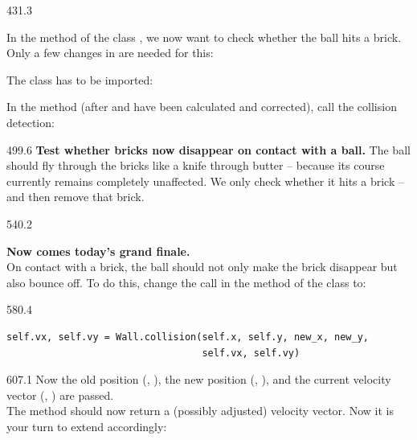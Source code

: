 \documentclass{aslab}
\begin{document}
\begin{region}[pitch=13.5]{431.3}
\begin{ntasks}
\item In the  method of the class , we now want to check
  whether the ball hits a brick. Only a few changes in  are
  needed for this:
  \begin{alist}
  \item The class  has to be imported: 
  \item In the  method (after  and  have
    been calculated and corrected), call the collision detection:
  \end{alist}
\end{ntasks}
\end{region}

\begin{region}[x=74.7,right=0,pitch=13.2]{499.6}
\textbf{Test whether bricks now disappear on contact with a ball.} The ball
should fly through the bricks like a knife through butter -- because its
course currently remains completely unaffected. We only check whether it hits
a brick -- and then remove that brick.
\end{region}

\begin{region}[pitch=13.35]{540.2}
\begin{ntasks}[start=2]
\item \textbf{Now comes today's grand finale.}\\
  On contact with a brick, the ball should not only make the brick disappear
  but also bounce off. To do this, change the call in the  method
  of the class  to:
\end{ntasks}
\end{region}

\begin{region}[x=74.7,right=0,pitch=13.2]{580.4}
\begin{lstlisting}[style=plain]
self.vx, self.vy = Wall.collision(self.x, self.y, new_x, new_y,
                                  self.vx, self.vy)
\end{lstlisting}
\end{region}

\begin{region}[x=74.7,right=0,pitch=13.4]{607.1}
Now the old position (, ), the new position
(, ), and the current velocity vector
(, ) are passed.\\
The method should now return a (possibly adjusted) velocity vector. Now it is
your turn to extend  accordingly:
\end{region}
\end{document}
